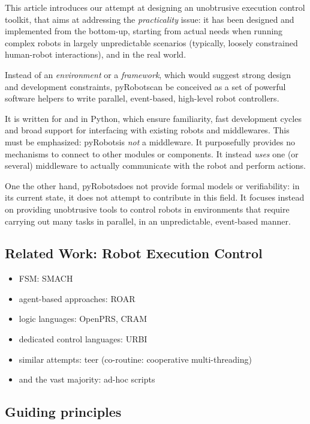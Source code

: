 \documentclass[a4paper, 10pt, conference]{ieeeconf}      %
\newcommand{\pyRobots}{{{\sc pyRobots}}}
\begin{document}
This article introduces our attempt at designing an unobtrusive execution control
toolkit, that aims at addressing the \emph{practicality} issue: it has been
designed and implemented from the bottom-up, starting from actual needs when
running complex robots in largely unpredictable scenarios (typically,
loosely constrained human-robot interactions), and in the real world.

Instead of an \emph{environment} or a \emph{framework}, which would suggest
strong design and development constraints, \pyRobots can be conceived as a set of
powerful software helpers to write parallel, event-based, high-level robot
controllers.

It is written for and in Python, which ensure familiarity, fast development
cycles and broad support for interfacing with existing robots and middlewares.
This must be emphasized: \pyRobots is \emph{not} a middleware. It purposefully
provides no mechanisms to connect to other modules or components. It instead
\emph{uses} one (or several) middleware to actually communicate with the robot
and perform actions.

One the other hand, \pyRobots does not provide formal models or verifiability:
in its current state, it does not attempt to contribute in this field. It
focuses instead on providing unobtrusive tools to control robots in environments
that require carrying out many tasks in parallel, in an unpredictable,
event-based manner.

\subsection{Related Work: Robot Execution Control}

\begin{itemize}
    \item FSM: SMACH
    \item agent-based approaches: ROAR
    \item logic languages: OpenPRS, CRAM
    \item dedicated control languages: URBI
    \item similar attempts: teer (co-routine: cooperative multi-threading)
    \item and the vast majority: ad-hoc scripts
\end{itemize}

\subsection{Guiding principles}
\end{document}
